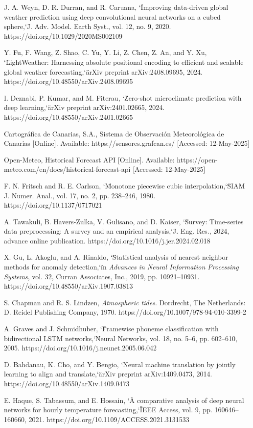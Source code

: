 \documentclass[spanish,a4paper,12pt,oneside]{extreport}
\begin{document}
\begin{thebibliography}{X}
J. A. Weyn, D. R. Durran, and R. Caruana, \char`\"Improving data-driven global weather prediction using deep convolutional neural networks on a cubed sphere,\char`\" J. Adv. Model. Earth Syst., vol. 12, no. 9, 2020. https://doi.org/10.1029/2020MS002109

Y. Fu, F. Wang, Z. Shao, C. Yu, Y. Li, Z. Chen, Z. An, and Y. Xu, \char`\"LightWeather: Harnessing absolute positional encoding to efficient and scalable global weather forecasting,\char`\" arXiv preprint arXiv:2408.09695, 2024. https://doi.org/10.48550/arXiv.2408.09695

I. Deznabi, P. Kumar, and M. Fiterau, \char`\"Zero-shot microclimate prediction with deep learning,\char`\" arXiv preprint arXiv:2401.02665, 2024. https://doi.org/10.48550/arXiv.2401.02665

Cartográfica de Canarias, S.A., Sistema de Observación Meteorológica de Canarias [Online]. Available: https://sensores.grafcan.es/ [Accessed: 12-May-2025]

Open-Meteo, Historical Forecast API [Online]. Available: https://open-meteo.com/en/docs/historical-forecast-api [Accessed: 12-May-2025]

F. N. Fritsch and R. E. Carlson, \char`\"Monotone piecewise cubic interpolation,\char`\" SIAM J. Numer. Anal., vol. 17, no. 2, pp. 238–246, 1980. https://doi.org/10.1137/0717021

A. Tawakuli, B. Havers-Zulka, V. Gulisano, and D. Kaiser, \char`\"Survey: Time-series data preprocessing: A survey and an empirical analysis,\char`\" J. Eng. Res., 2024, advance online publication. https://doi.org/10.1016/j.jer.2024.02.018

X. Gu, L. Akoglu, and A. Rinaldo, \char`\"Statistical analysis of nearest neighbor methods for anomaly detection,\char`\" in \textit{Advances in Neural Information Processing Systems}, vol. 32, Curran Associates, Inc., 2019, pp. 10921–10931. https://doi.org/10.48550/arXiv.1907.03813

S. Chapman and R. S. Lindzen, \textit{Atmospheric tides}. Dordrecht, The Netherlands: D. Reidel Publishing Company, 1970. https://doi.org/10.1007/978-94-010-3399-2

A. Graves and J. Schmidhuber, \char`\"Framewise phoneme classification with bidirectional LSTM networks,\char`\" Neural Networks, vol. 18, no. 5–6, pp. 602–610, 2005. https://doi.org/10.1016/j.neunet.2005.06.042

D. Bahdanau, K. Cho, and Y. Bengio, \char`\"Neural machine translation by jointly learning to align and translate,\char`\" arXiv preprint arXiv:1409.0473, 2014. https://doi.org/10.48550/arXiv.1409.0473

E. Haque, S. Tabassum, and E. Hossain, \char`\"A comparative analysis of deep neural networks for hourly temperature forecasting,\char`\" IEEE Access, vol. 9, pp. 160646–160660, 2021. https://doi.org/10.1109/ACCESS.2021.3131533

\end{thebibliography}
\end{document}
